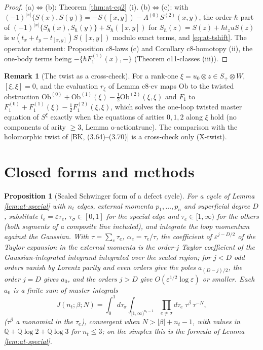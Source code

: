 \documentclass[11pt]{article}
\numberwithin{equation}{section}
\theoremstyle{plain}
\newtheorem{proposition}[theorem]{Proposition}
\theoremstyle{definition}
\newtheorem{remark}[theorem]{Remark}
\newcommand{\Ob}{\mathrm{Ob}}
\begin{document}
\begin{proof}
(a)$\Leftrightarrow$(b): Theorem \ref{thm:at-eq2} (i). (b)$\Leftrightarrow$(c): with $(-1)^{|x|}\{S(x),S(y)\}=-S([x,y])-\Lambda^{(0)}S^{(2)}(x,y)$, the order-$\hbar$ part of $(-1)^{|x|}\{S_\hbar(x),S_\hbar(y)\}+S_\hbar([x,y])$ for $S_\hbar(z)=S(z)+\hbar t_zuS(z)$ is $u(t_x+t_y-t_{[x,y]})S([x,y])$ modulo exact terms, and \eqref{eq:at-tshift}. The operator statement: Proposition c8-laws (c) and Corollary c8-homotopy (ii), the one-body terms being $-\{\hbar F_1^{(1)}(x),-\}$ (Theorem c11-classes (iii)).
\end{proof}

\begin{remark}[The twist as a cross-check]
\label{rem:at-twist}
For a rank-one $\xi=u_0\otimes z\in S_+\otimes W$, $[\xi,\xi]=0$, and the evaluation $r_\xi$ of Lemma c8-ev maps $\Ob$ to the twisted obstruction $\Ob^{(0)}+\Ob^{(1)}(\xi)-\tfrac12\Ob^{(2)}(\xi,\xi)$ and $F_1$ to $F_1^{(0)}+F_1^{(1)}(\xi)-\tfrac12F_1^{(2)}(\xi,\xi)$, which solves the one-loop twisted master equation of $S^\xi$ exactly when the equations of arities $0,1,2$ along $\xi$ hold (no components of arity $\ge3$, Lemma o-actiontrunc). The comparison with the holomorphic twist of [BK, (3.64)--(3.70)] is a cross-check only (X-twist).
\end{remark}

\section{Closed forms and methods}
\label{sec:at-closed}

\begin{proposition}[Scaled Schwinger form of a defect cycle]
\label{prop:at-schwinger}
For a cycle of Lemma \ref{lem:at-special} with $n_t$ edges, external momenta $p_1,\dots,p_n$ and superficial degree $D$, substitute $t_e=\varepsilon\tau_e$, $\tau_\sigma\in[0,1]$ for the special edge and $\tau_e\in[1,\infty)$ for the others (both segments of a composite line included), and integrate the loop momentum against the Gaussian. With $\tau=\sum_e\tau_e$, $\alpha_e=\tau_e/\tau$, the coefficient of $\varepsilon^{j-D/2}$ of the Taylor expansion in the external momenta is the order-$j$ Taylor coefficient of the Gaussian-integrated integrand integrated over the scaled region; for $j<D$ odd orders vanish by Lorentz parity and even orders give the poles $a_{(D-j)/2}$, the order $j=D$ gives $a_0$, and the orders $j>D$ give $O(\varepsilon^{1/2}\log\varepsilon)$ or smaller. Each $a_0$ is a finite sum of master integrals
\[
J(n_t;\beta;N)=\int_0^1d\tau_\sigma\int_{[1,\infty)^{n_t-1}}\prod_{e\ne\sigma}d\tau_e\;\tau^\beta\,\tau^{-N},
\]
($\tau^\beta$ a monomial in the $\tau_e$), convergent when $N>|\beta|+n_t-1$, with values in $\mathbb Q+\mathbb Q\log2+\mathbb Q\log3$ for $n_t\le3$; on the simplex this is the formula of Lemma \ref{lem:at-special}.
\end{proposition}
\end{document}

